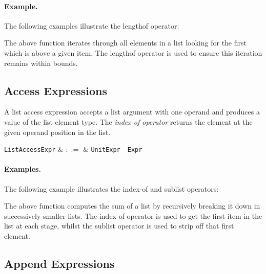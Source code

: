 \paragraph{Example.} The following examples illustrate the lengthof operator:



The above function iterates through all elements in a list looking for the first which is above a given item.  The lengthof operator is used to ensure this iteration remains within bounds.


\subsection{Access Expressions}
\label{c_expr_list_access}

A list access expression accepts a list argument with one operand and produces a value of the list element type.  The {\em index-of operator} returns the element at the given operand position in the list.  

\begin{syntax}
  \verb+ListAccessExpr+ & $::=$ & \verb+UnitExpr+\ \token{[}\ \verb+Expr+\ \token{]}\\
\end{syntax}

\paragraph{Examples.} The following example illustrates the index-of and sublist operators:



The above function computes the sum of a list by recursively breaking it down in successively smaller lists.  The index-of operator is used to get the first item in the list at each stage, whilst the sublist operator is used to strip off that first element. 


\subsection{Append Expressions}
\label{c_expr_append}

